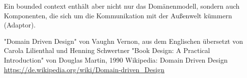 \documentclass[11pt,a4paper]{scrartcl}
\begin{document}
Ein bounded context enthält aber nicht nur das Domänenmodell, sondern auch Komponenten, die sich um die Kommunikation mit der Außenwelt kümmern (Adaptor).

\no{*} %

\begin{thebibliography}{\hspace{1cm}}
	 "Domain Driven Design" von Vaughn Vernon, aus dem Englischen übersetzt von Carola Lilienthal und Henning Schwertner
	 "Book Design: A Practical Introduction" von Douglas Martin, 1990
	 Wikipedia: Domain Driven Design \url{https://de.wikipedia.org/wiki/Domain-driven_Design}
\end{thebibliography}
\end{document}
